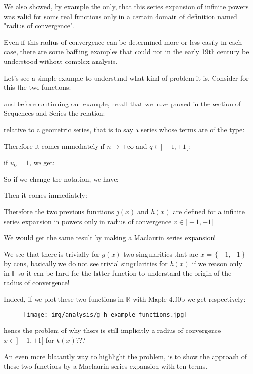 	We also showed, by example the only, that this series expansion of infinite powers was valid for some real functions only in a certain domain of definition named "radius of convergence".
	
	Even if this radius of convergence can be determined more or less easily in each case, there are some baffling examples that could not in the early 19th century be understood without complex analysis.
	
	Let's see a simple example to understand what kind of problem it is. Consider for this the two functions:
	
	and before continuing our example, recall that we have proved in the section of Sequences and Series the relation:
	
	relative to a geometric series, that is to say a series whose terms are of the type:
	
	Therefore it comes immediately if $n \rightarrow +\infty$ and $q \in ]-1,+1[$:
	
	if $u_0=1$, we get:
	
	So if we change the notation, we have:
	
	Then it comes immediately:
	
	Therefore the two previous functions $g(x)$ and $h(x)$ are defined for a infinite series expansion in powers only in radius of convergence $x \in ]-1,+1[$.
	
	We would get the same result by making a Maclaurin series expansion!
	
	We see that there is trivially for $g(x)$ two singularities that are $x=\left\lbrace -1,+1\right\rbrace$ by cons, basically we do not see trivial singularities for $h (x)$ if we reason only in $\mathbb{F}$ so it can be hard for the latter function to understand the origin of the radius of convergence!
	
	Indeed, if we plot these two functions in $\mathbb{R}$ with Maple 4.00b we get respectively:
	\begin{figure}[H]
		\begin{center}
			\texttt{[image: img/analysis/g\_h\_example\_functions.jpg]}
		\end{center}
	\end{figure}
	hence the problem of why there is still implicitly a radius of convergence $x \in ]-1,+1[$ for $h (x)$???
	
	An even more blatantly way to highlight the problem, is to show the approach of these two functions by a Maclaurin series expansion with ten terms.
	

